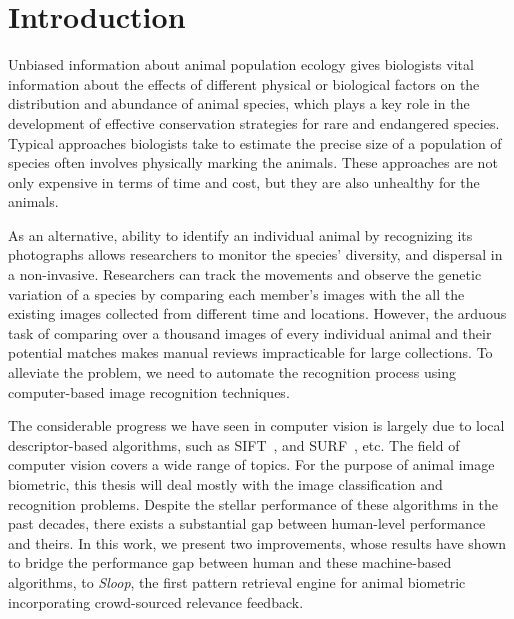 
\chapter{Introduction}

Unbiased information about animal population ecology gives biologists vital
information about the effects of different physical or biological factors on
the distribution and abundance of animal species, which plays a key role in the
development of effective conservation strategies for rare and endangered
species. Typical approaches biologists take to estimate the precise size of a
population of species often involves physically marking the animals. These
approaches are not only expensive in terms of time and cost, but they are also
unhealthy for the animals.

As an alternative, ability to identify an individual animal by recognizing its
photographs allows researchers to monitor the species' diversity, and dispersal
in a non-invasive. Researchers can track the movements and observe the genetic
variation of a species by comparing each member's images with the all the
existing images collected from different time and locations. However, the
arduous task of comparing over a thousand images of every individual animal and
their potential matches makes manual reviews impracticable for large
collections. To alleviate the problem, we need to automate the recognition
process using computer-based image recognition techniques.

The considerable progress we have seen in computer vision is largely due to
local descriptor-based algorithms, such as SIFT~\cite{lowe04}, and
SURF~\cite{surf08}, etc. The field of computer vision covers a wide range of
topics. For the purpose of animal image biometric, this thesis will deal mostly
with the image classification and recognition problems. Despite the stellar
performance of these algorithms in the past decades, there exists a substantial
gap between human-level performance and theirs. In this work, we present two
improvements, whose results have shown to bridge the performance gap between
human and these machine-based algorithms, to \emph{Sloop}, the first pattern
retrieval engine for animal biometric incorporating crowd-sourced relevance
feedback.

